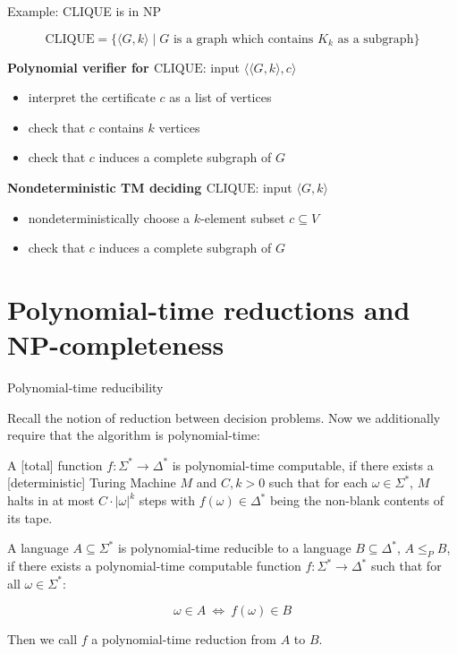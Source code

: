 \documentclass[handout]{beamer}
\begin{document}
\begin{frame}{Example: CLIQUE is in NP}

    $$
    \mathrm{CLIQUE}=\{\langle G,k\rangle\mid G \text{ is a graph which contains }K_k\text{ as a subgraph}\}
    $$

    \textbf{Polynomial verifier for $\mathrm{CLIQUE}$}: input $\langle \langle G,k\rangle,c\rangle$
    \begin{itemize}
        \item interpret the certificate $c$ as a list of vertices
        \item check that $c$ contains $k$ vertices
        \item check that $c$ induces a complete subgraph of $G$
    \end{itemize}

    \textbf{Nondeterministic TM deciding $\mathrm{CLIQUE}$}: input $\langle G,k\rangle$
    \begin{itemize}
        \item nondeterministically choose a $k$-element subset $c\subseteq V$
        \item check that $c$ induces a complete subgraph of $G$
    \end{itemize}

\end{frame}


\section*{Polynomial-time reductions and NP-completeness}


\begin{frame}{Polynomial-time reducibility}
    
    Recall the notion of \alert{reduction} between decision problems. Now we additionally require that the algorithm is polynomial-time:

    \medskip
    
    A [total] function $f: \Sigma^*\to \Delta^*$ is \alert{polynomial-time computable}, if there exists a [deterministic] Turing Machine $M$ and $C,k>0$ such that for each $\omega\in\Sigma^*$, $M$ halts in at most $C\cdot |\omega|^k$ steps with $f(\omega)\in\Delta^*$ being the non-blank contents of its tape.

    \medskip

    \begin{definition}
        A language $A\subseteq\Sigma^*$ is \alert{polynomial-time reducible} to a language $B\subseteq\Delta^*$, \alert{$A\leq_P B$}, if there exists a polynomial-time computable function $f: \Sigma^*\to \Delta^*$ such that for all $\omega\in \Sigma^*$:

        \vspace{-12pt}
        $$
        \omega\in A \ \Leftrightarrow\ f(\omega)\in B
        $$
        \vspace{-20pt}

        Then we call $f$ a \alert{polynomial-time reduction} from $A$ to $B$.
    \end{definition}
    
\end{frame}
\end{document}
